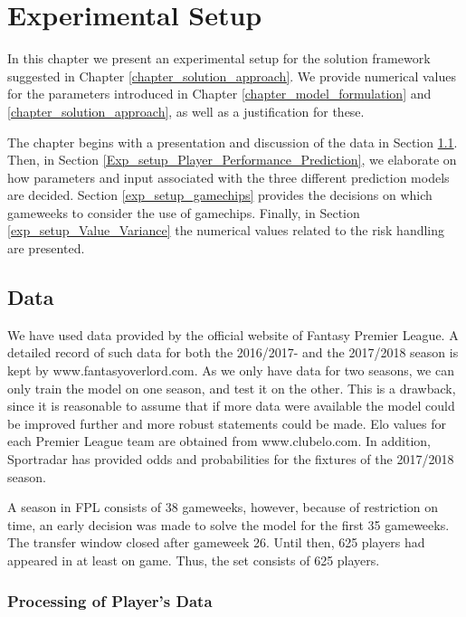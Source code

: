 \chapter{Experimental Setup}\label{chapter_experimental_setup}

In this chapter we present an experimental setup for the solution framework suggested in Chapter \ref{chapter_solution_approach}. We provide numerical values for the parameters introduced in Chapter \ref{chapter_model_formulation} and \ref{chapter_solution_approach}, as well as a justification for these. 

\newpar

The chapter begins with a presentation and discussion of the data in Section \ref{exp_setup_data}. Then, in Section \ref{Exp_setup_Player_Performance_Prediction}, we elaborate on how parameters and input associated with the three different prediction models are decided. Section \ref{exp_setup_gamechips} provides the decisions on which gameweeks to consider the use of gamechips. Finally, in Section \ref{exp_setup_Value_Variance} the numerical values related to the risk handling are presented.

\section{Data} \label{exp_setup_data}
We have used data provided by the official website of Fantasy Premier League. A detailed record of such data for both the 2016/2017- and the 2017/2018 season is kept by www.fantasyoverlord.com. As we only have data for two seasons, we can only train the model on one season, and test it on the other. This is a drawback, since it is reasonable to assume that if more data were available the model could be improved further and more robust statements could be made. Elo values for each Premier League team are obtained from www.clubelo.com. In addition, Sportradar has provided odds and probabilities for the fixtures of the 2017/2018 season. 

\newpar

A season in FPL consists of 38 gameweeks, however, because of restriction on time, an early decision was made to solve the model for the first 35 gameweeks. The transfer window closed after gameweek 26. Until then, 625 players had appeared in at least on game. Thus, the set consists of 625 players.

\subsection{Processing of Player's Data}

